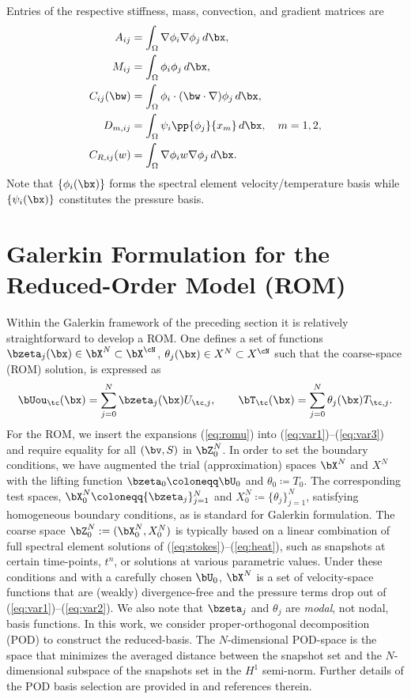 %
Entries of the respective stiffness, mass, convection, and
gradient matrices are
%
\begin{align}
   \label{eq:A} A_{ij} &= \int_{\Omega} \nabla \phi_i \nabla \phi_j\, d\bx,
   \\
   \label{eq:M} M_{ij} &= \int_{\Omega} \phi_i \phi_j\, d\bx, \\ 
   \label{eq:C} C_{ij}(\bw) &= \int_{\Omega} \phi_i\cdot( \bw \cdot \nabla)
   \phi_j \, d\bx, \\ 
   \label{eq:D} D_{m,ij} &= \int_{\Omega} \psi_i \pp{\phi_j}{x_m} \,d\bx,
   \quad m=1,2,\\
   \label{eq:C_R} C_{R,ij}(w) &= \int_{\Omega} \nabla \phi_i w \nabla
   \phi_j \, d\bx. 
\end{align}
%
Note that $\{ \phi_i(\bx)\}$ forms the spectral element
velocity/temperature basis while $\{ \psi_i(\bx)\}$ constitutes
the pressure basis.

\section{Galerkin Formulation for the Reduced-Order Model (ROM)}\label{galerkin_rom}
\noindent Within the Galerkin framework of the preceding section it is
relatively straightforward to develop a ROM.  One defines a set of functions
$\bzeta_j(\bx) \in \bX^N \subset \bX^{\cN}$, $\theta_j(\bx) \in X^N \subset
X^{\cN}$ such that the coarse-space (ROM) solution, is expressed as
%
\begin{equation} \label{eq:romu}
   \bUou_\tc(\bx) = \sum_{j=0}^N \bzeta_j(\bx) U_{\tc,j}, \qquad
   \bT_\tc(\bx) = \sum_{j=0}^N \theta_j(\bx) T_{\tc,j}.
\end{equation}
%
For the ROM, we insert the expansions (\ref{eq:romu}) into
(\ref{eq:var1})--(\ref{eq:var3}) and require equality for all $(\bv,S)$  in
$\bZ_0^N$. In order to set the boundary conditions, we have augmented the trial
(approximation) spaces $\bX^N$ and $X^N$ with the lifting function $\bzeta_0
\coloneqq \bU_0$ and $\theta_0 \coloneqq T_0$.  The corresponding test spaces,
$\bX_0^N \coloneqq \{\bzeta_j\}^N_{j=1}$ and $X_0^N \coloneqq
\{\theta_j\}^N_{j=1}$, satisfying homogeneous boundary conditions, as is
standard for Galerkin formulation.  The coarse space $\bZ_0^N :=
(\bX_0^N,X_0^N)$ is typically based on a linear combination of full spectral
element solutions of (\ref{eq:stokes})--(\ref{eq:heat}), such as snapshots at
certain time-points, $t^n$, or solutions at various parametric values.  Under
these conditions and with a carefully chosen $\bU_0$, $\bX^N$ is a set of
velocity-space functions that are (weakly) divergence-free and the pressure
terms drop out of (\ref{eq:var1})--(\ref{eq:var2}).  We also note that
$\bzeta_j$ and $\theta_j$ are {\em modal}, not nodal, basis functions.  In this
work, we consider proper-orthogonal decomposition (POD) to construct the
reduced-basis.  The $N$-dimensional POD-space is the space that minimizes the
averaged distance between the snapshot set and the $N$-dimensional subspace of
the snapshots set in the $H^1$ semi-norm.  Further details of the POD basis
selection are provided in \cite{kaneko2020towards} and references therein.

